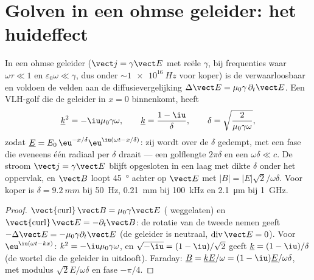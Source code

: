 \section{Golven in een ohmse geleider: het huideffect}

\begin{theorem}[Huideffect]\label{thm:b2:waves-in-media:skin}
In een ohmse geleider ($\vect j = \gamma\vect E$ met reële $\gamma$, bij
frequenties waar $\omega\tau \ll 1$ en $\varepsilon_0\omega \ll \gamma$, dus
onder $\sim\qty{1e16}{Hz}$ voor koper) is de 
verwaarloosbaar en voldoen de velden aan de diffusievergelijking
$\Delta\vect E = \mu_0\gamma\,\partial_t\vect E$. Een VLH-golf die de
geleider in $x = 0$ binnenkomt, heeft
\[
\underline k^2 = -\iu\mu_0\gamma\omega , \qquad \underline k = \frac{1 - \iu}\delta , \qquad
\delta = \sqrt{\frac2{\mu_0\gamma\omega}} ,
\]
zodat $\underline E = E_0\,\eu^{-x/\delta}\eu^{\iu(\omega t - x/\delta)}$:
zij wordt over de \emph{} $\delta$ gedempt, met een fase die
eveneens één radiaal per $\delta$ draait --- een golflengte $2\pi\delta$ en
een  $\omega\delta \ll
c$. De stroom $\vect j = \gamma\vect E$
blijft opgesloten in een laag met dikte $\delta$ onder het oppervlak, en
$\vect B$ loopt \qty{45}{\degree} achter op $\vect E$ met
$|B| = |E|\sqrt2/\omega\delta$. Voor koper is $\delta = \qty{9.2}{mm}$ bij
\qty{50}{Hz}, \qty{0.21}{mm} bij \qty{100}{kHz} en \qty{2.1}{\micro m} bij
\qty{1}{GHz}.
\end{theorem}

\begin{proof}
$\operatorname{\vect{curl}}\vect B = \mu_0\gamma\vect E$
( weggelaten) en
$\operatorname{\vect{curl}}\vect E = -\partial_t\vect B$: de rotatie van de
tweede nemen geeft $-\Delta\vect E = -\mu_0\gamma\partial_t\vect E$ (de
geleider is neutraal, $\operatorname{div}
\vect E = 0$). Voor
$\eu^{\iu(\omega t - kx)}$: $k^2 = -\iu\mu_0\gamma\omega$, en
$\sqrt{-\iu} = (1 - \iu)/\sqrt2$ geeft $\underline k = (1 - \iu)/\delta$ (de
wortel die de geleider in uitdooft). Faraday:
$\underline B = \underline k\underline E/\omega = (1 - \iu)
\underline E/\omega\delta$,
met modulus $\sqrt2E/\omega\delta$ en fase $-\pi/4$.
\end{proof}

